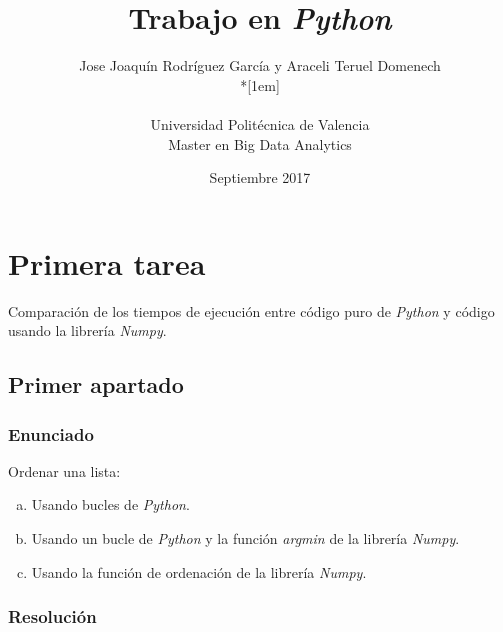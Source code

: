 \documentclass[12pt,twoside]{article}
\title{Trabajo en \textit{Python}}
\author{Jose Joaquín Rodríguez García y Araceli Teruel Domenech\\*[1em]
\begin{minipage}{0.75\textwidth}
\footnotesize \itshape
\begin{center}
Universidad Politécnica de Valencia \\
Master en Big Data Analytics
\end{center}
\end{minipage}
}
\date{Septiembre 2017}
\begin{document}
\maketitle
%



\section{Primera tarea}

Comparación de los tiempos de ejecución entre código puro de \textit{Python} y código usando la librería \textit{Numpy}.

\subsection{Primer apartado}

\subsubsection{Enunciado}

\noindent
Ordenar una lista:

\begin{enumerate}[(a)]

\item Usando bucles de \textit{Python}.

\item Usando un bucle de \textit{Python} y la función \textit{argmin} de la librería \textit{Numpy}.

\item Usando la función de ordenación de la librería \textit{Numpy}.

\end{enumerate}

\subsubsection{Resolución}
\end{document}

